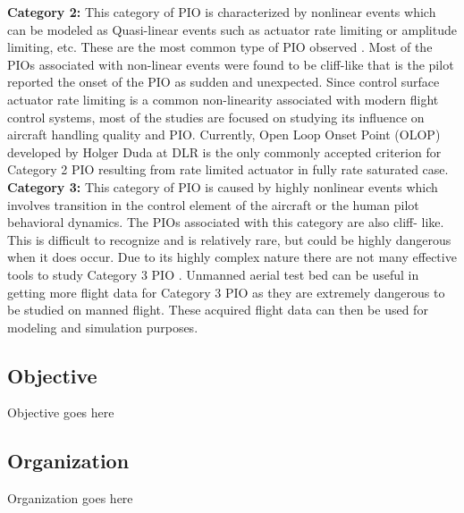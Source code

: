 \textbf{Category 2:} This category of PIO is characterized by nonlinear events which can be modeled as Quasi-linear
events such as actuator rate limiting or amplitude limiting, etc. These are the most common type of PIO observed\cite{mcruer1997aviation} .
Most of the PIOs associated with non-linear events were found to be cliff-like that is the pilot reported the onset of
the PIO as sudden and unexpected. Since control surface actuator rate limiting is a common non-linearity associated
with modern flight control systems\cite{klyde2004investigating}\cite{duda1997prediction}\cite{amato2000analysis}\cite{hanke1995handling}, most of the studies are focused on studying its influence on aircraft handling quality and PIO. Currently, Open Loop Onset Point\cite{duda1997prediction} (OLOP) developed by Holger Duda at DLR is the only commonly accepted criterion\cite{moorhouse2000flight}\cite{garteur1999evaluation} for Category 2 PIO resulting from rate limited actuator in fully rate saturated case.\\
\textbf{Category 3:} This category of PIO is caused by highly nonlinear events which involves transition in the control
element of the aircraft or the human pilot behavioral dynamics. The PIOs associated with this category are also cliff-
like. This is difficult to recognize and is relatively rare, but could be highly dangerous when it does occur\cite{mcruer1997aviation}. Due to its highly complex nature there are not many effective tools to study Category 3 PIO . Unmanned aerial test bed can be useful in getting more flight data for Category 3 PIO as they are extremely dangerous to be studied on manned flight. These acquired flight data can then be used for modeling and simulation purposes.


\subsection{Objective}

Objective goes here


\subsection{Organization}
Organization goes here

